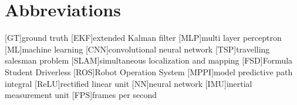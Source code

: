 \chapter{Abbreviations}

\begin{acronym}[AAPC]
	[GT]{ground truth}
	[EKF]{extended Kalman filter}
	[MLP]{multi layer perceptron}
	[ML]{machine learning}
	[CNN]{convolutional neural network}
	[TSP]{travelling salesman problem}
	[SLAM]{simultaneous localization and mapping}
	[FSD]{Formula Student Driverless}
	[ROS]{Robot Operation System}
	[MPPI]{model predictive path integral}
	[ReLU]{rectified linear unit}
	[NN]{neural network}
	[IMU]{inertial measurement unit}
	[FPS]{frames per second}

\end{acronym}